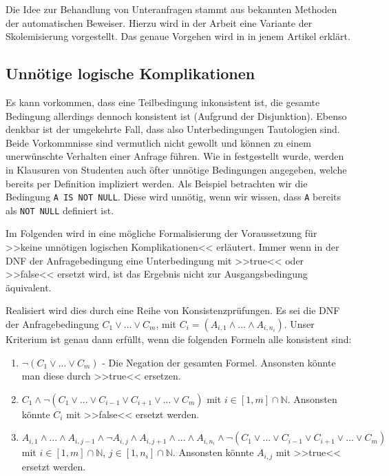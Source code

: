 Die Idee zur Behandlung von Unteranfragen stammt aus bekannten Methoden der automatischen Beweiser. Hierzu wird in der Arbeit \cite{brass1} eine Variante der Skolemisierung vorgestellt. Das genaue Vorgehen wird in in jenem Artikel erklärt.

\subsection{Unnötige logische Komplikationen}

Es kann vorkommen, dass eine Teilbedingung inkonsistent ist, die gesamte Bedingung allerdings dennoch konsistent ist (Aufgrund der Disjunktion). Ebenso denkbar ist der umgekehrte Fall, dass also Unterbedingungen Tautologien sind. Beide Vorkommnisse sind vermutlich nicht gewollt und können zu einem unerwünschte Verhalten einer Anfrage führen. Wie in \cite{brass2} festgestellt wurde, werden in Klausuren von Studenten auch öfter unnötige Bedingungen angegeben, welche bereits per Definition impliziert werden. Als Beispiel betrachten wir die Bedingung \verb|A IS NOT NULL|. Diese wird unnötig, wenn wir wissen, dass \verb|A| bereits als \verb|NOT NULL| definiert ist.

Im Folgenden wird in \cite{brass2} eine mögliche Formalisierung der Voraussetzung für >>keine unnötigen logischen Komplikationen<< erläutert. Immer wenn in der DNF der Anfragebedingung eine Unterbedingung mit >>true<< oder >>false<< ersetzt wird, ist das Ergebnis nicht zur Ausgangsbedingung äquivalent.

Realisiert wird dies durch eine Reihe von Konsistenzprüfungen. Es sei die DNF der Anfragebedingung $C_1\vee ...\vee C_m$, mit $C_i=(A_{i,1}\wedge ...\wedge A_{i,n_i})$. Unser Kriterium ist genau dann erfüllt, wenn die folgenden Formeln alle konsistent sind:

\begin{enumerate}
\item $\neg(C_1 \vee ... \vee C_m)$ - Die Negation der gesamten Formel. Ansonsten könnte man diese durch >>true<< ersetzen.
\item $C_1 \wedge \neg(C_1 \vee ... \vee C_{i-1} \vee C_{i+1} \vee ... \vee C_m)$ mit $i\in [1,m]\cap \mathbb{N}$. Ansonsten könnte $C_i$ mit >>false<< ersetzt werden.
\item  $A_{i,1} \wedge ... \wedge A_{i,j-1} \wedge  \neg A_{i,j} \wedge A_{i,j+1} \wedge ... \wedge A_{i,n_i} \wedge \neg(C_1 \vee ... \vee C_{i-1} \vee C_{i+1} \vee ... \vee C_m)$ mit $i\in [1,m] \cap \mathbb{N}$, $j\in [1,n_i]\cap \mathbb{N}$. Ansonsten könnte $A_{i,j}$ mit >>true<< ersetzt werden.
\end{enumerate}

